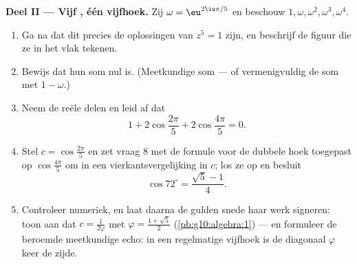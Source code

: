 \begin{problem}
\medskip
\noindent\textbf{Deel II --- Vijf , één vijfhoek.}
Zij $\omega = \eu^{2\iu\pi/5}$ en beschouw
$1, \omega, \omega^2, \omega^3, \omega^4$.
\begin{enumerate}[resume]
  \item Ga na dat dit precies de oplossingen van $z^5 = 1$ zijn, en beschrijf
        de figuur die ze in het vlak tekenen.
  \item Bewijs dat hun som nul is. (Meetkundige som --- of vermenigvuldig de
        som met $1 - \omega$.)
  \item Neem de reële delen en leid af dat
        \[
        1 + 2\cos\frac{2\pi}{5} + 2\cos\frac{4\pi}{5} = 0 .
        \]
  \item Stel $c = \cos\frac{2\pi}{5}$ en zet vraag 8 met de formule voor de
        dubbele hoek toegepast op $\cos\frac{4\pi}{5}$ om in een
        vierkantsvergelijking in $c$; los ze op en besluit
        \[
        \cos 72^\circ = \frac{\sqrt5 - 1}{4} .
        \]
  \item Controleer numeriek, en laat daarna de gulden snede haar werk
        signeren: toon aan dat $c = \frac{1}{2\varphi}$ met
        $\varphi = \frac{1 + \sqrt5}{2}$ (\cref{pb:g10:algebra:1}) --- en
        formuleer de beroemde meetkundige echo: in een regelmatige vijfhoek is
        de diagonaal $\varphi$ keer de zijde.
\end{enumerate}


\end{problem}

